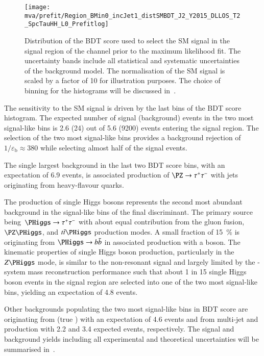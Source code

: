 \begin{figure}[htbp]
  \centering

  \texttt{[image: mva/prefit/Region\_BMin0\_incJet1\_distSMBDT\_J2\_Y2015\_DLLOS\_T2\_SpcTauHH\_L0\_Prefitlog]}

  \caption{Distribution of the BDT score used to select the SM \HH
    signal in the signal region of the \hadhad channel prior to the
    maximum likelihood fit. The uncertainty bands include all
    statistical and systematic uncertainties of the background
    model. The normalisation of the SM \HH signal is scaled by a
    factor of 10 for illustration purposes. The choice of binning for
    the histograms will be discussed in~.}
  \label{fig:mva_smbdt_prefit}
\end{figure}

The sensitivity to the SM \HH signal is driven by the last bins of the
BDT score histogram.  The expected number of signal (background)
events in the two most signal-like bins is 2.6 (24) out of 5.6 (9200)
events entering the signal region. The selection of the two most
signal-like bins provides a background rejection of
$1 / \varepsilon_{\text{b}} \approx 380$ while selecting almost half
of the signal events.

The single largest background in the last two BDT score bins, with an
expectation of 6.9 events, is associated production of
$\PZ \rightarrow \tautau$ with jets originating from heavy-flavour
quarks.

The production of single Higgs bosons represents the second most
abundant background in the signal-like bins of the final
discriminant. The primary source being~$\PHiggs \rightarrow \tautau$
with about equal contribution from the gluon fusion, $\PZ\PHiggs$, and
$\ttbar\PHiggs$ production modes. A small fraction of
\SI{15}{\percent} is originating from $\PHiggs \rightarrow \bbbar$ in
associated production with a \PZ boson. The kinematic properties of
single Higgs boson production, particularly in the $Z\PHiggs$ mode, is
similar to the non-resonant \HH signal and largely limited by the
\PHiggs-system mass reconstruction performance such that about 1 in 15
single Higgs boson events in the signal region are selected into one
of the two most signal-like bins, yielding an expectation of 4.8
events.

Other backgrounds populating the two most signal-like bins in BDT
score are originating from \ttbar (true \tauhadvis) with an
expectation of 4.6 events and \jettotauhadvis from multi-jet and
\ttbar production with 2.2 and 3.4 expected events, respectively. The
signal and background yields including all experimental and
theoretical uncertainties will be summarised
in~.

